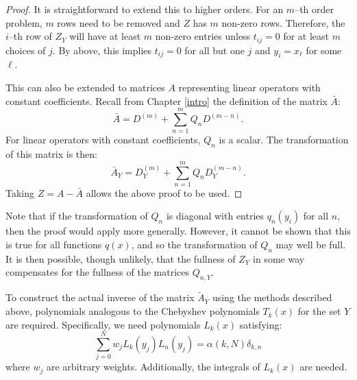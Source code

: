 \documentclass{sfuthesis}
\begin{document}
\begin{proof}
It is straightforward to extend this to higher orders.
For an $m$--th order problem, $m$ rows need to be removed and $Z$ has $m$ non-zero rows.
Therefore, the $i$--th row of $Z_Y$ will have at least $m$ non-zero entries unless $t_{ij}=0$ for at least $m$ choices of $j$.
By above, this implies $t_{ij} = 0$ for all but one $j$ and $y_i = x_\ell$ for some $\ell$.

This can also be extended to matrices $A$ representing linear operators with constant coefficients.
Recall from Chapter \ref{intro} the definition of the matrix $\bar{A}$:
\begin{equation}
\bar{A} = D^{(m)} + \sum_{n=1}^m Q_n D^{(m-n)} .
\end{equation}
For linear operators with constant coefficients, $Q_n$ is a scalar.
The transformation of this matrix is then:
\begin{equation}
\bar{A}_Y = D^{(m)}_Y + \sum_{n=1}^m Q_n D^{(m-n)}_Y .
\end{equation}
Taking $Z = A - \bar{A}$ allows the above proof to be used.

\end{proof}

Note that if the transformation of $Q_n$ is diagonal with entries $q_n(y_i)$ for all $n$, then the proof would apply more generally.
However, it cannot be shown that this is true for all functions $q(x)$, and so the transformation of $Q_n$ may well be full.
It is then possible, though unlikely, that the fullness of $Z_Y$ in some way compensates for the fullness of the matrices $Q_{n,Y}$.

To construct the actual inverse of the matrix $\tilde{A}_Y$ using the methods described above,
polynomials analogous to the Chebyshev polynomials $T_k(x)$ for the set $Y$ are required.
Specifically, we need polynomials $L_k(x)$ satisfying:
\begin{equation}
\sum_{j=0}^N w_j L_k(y_j) L_n(y_j) = \alpha(k,N) \delta_{k,n}
\end{equation}
where $w_j$ are arbitrary weights.
Additionally, the integrals of $L_k(x)$ are needed.

\end{document}
